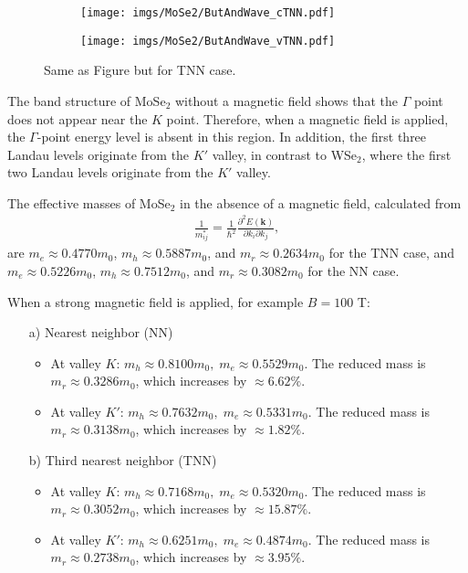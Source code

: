 \documentclass{article}
\begin{document}
\begin{figure}[!h]
	\begin{subfigure}{0.495\textwidth}
		\centering
		\texttt{[image: imgs/MoSe2/ButAndWave\_cTNN.pdf]}
	\end{subfigure}
	\begin{subfigure}{0.495\textwidth}
		\centering
		\texttt{[image: imgs/MoSe2/ButAndWave\_vTNN.pdf]}
	\end{subfigure}
	\caption{Same as Figure but for TNN case.}
\end{figure}

The band structure of MoSe$_{2}$ without a magnetic field shows that the $\Gamma$ point does not appear near the $K$ point. Therefore, when a magnetic field is applied, the $\Gamma$-point energy level is absent in this region. In addition, the first three Landau levels originate from the $K'$ valley, in contrast to WSe$_{2}$, where the first two Landau levels originate from the $K'$ valley.

The effective masses of MoSe$_{2}$ in the absence of a magnetic field, calculated from
\begin{gather}
	\frac{1}{m_{ij}^{*}} = \frac{1}{\hbar^{2}} \frac{\partial^{2} E(\mathbf{k})}{\partial k_{i}\partial k_{j}},
\end{gather}
are $m_{e} \approx 0.4770 m_{0}$, $m_{h} \approx 0.5887 m_{0}$, and $m_{r} \approx 0.2634 m_{0}$ for the TNN case, and $m_{e} \approx 0.5226 m_{0}$, $m_{h} \approx 0.7512 m_{0}$, and $m_{r} \approx 0.3082 m_{0}$ for the NN case.

When a strong magnetic field is applied, for example $B = 100$ T:

\begin{itemize}
	\item[a)] Nearest neighbor (NN)
	      \begin{itemize}
		      \item At valley $K$: $m_{h} \approx 0.8100 m_{0},\; m_{e} \approx 0.5529 m_{0}$.
		            The reduced mass is $m_{r} \approx 0.3286 m_{0}$, which increases by $\approx 6.62\%$.

		      \item At valley $K'$: $m_{h} \approx 0.7632 m_{0},\; m_{e} \approx 0.5331 m_{0}$.
		            The reduced mass is $m_{r} \approx 0.3138 m_{0}$, which increases by $\approx 1.82\%$.
	      \end{itemize}
	\item[b)] Third nearest neighbor (TNN)
	      \begin{itemize}
		      \item At valley $K$: $m_{h} \approx 0.7168 m_{0},\; m_{e} \approx 0.5320 m_{0}$.
		            The reduced mass is $m_{r} \approx 0.3052 m_{0}$, which increases by $\approx 15.87\%$.

		      \item At valley $K'$: $m_{h} \approx 0.6251 m_{0},\; m_{e} \approx 0.4874 m_{0}$.
		            The reduced mass is $m_{r} \approx 0.2738 m_{0}$, which increases by $\approx 3.95\%$.
	      \end{itemize}
\end{itemize}
\end{document}
